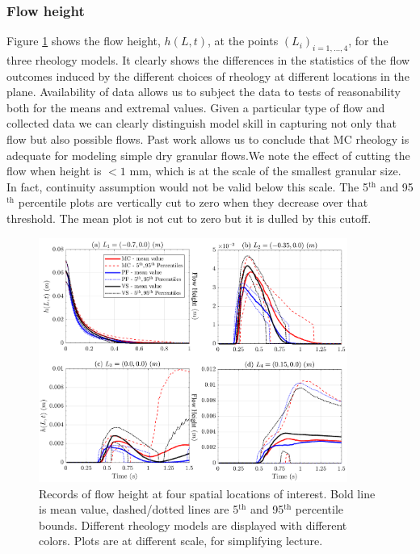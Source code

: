 \documentclass{article}
\begin{document}
\subsubsection{Flow height}
Figure \ref{fig:Ramp-H} shows the flow height, $h(L,t)$, at the points $(L_i)_{i=1,\dots,4}$, for the three rheology models. It clearly shows the differences in the statistics of the flow outcomes induced by the different choices of rheology at different locations in the plane. Availability of data allows us to subject the data to tests of reasonability both for the means and extremal values. Given a particular type of flow and collected data we can clearly distinguish model  skill in capturing not only that flow but also possible flows. Past work \cite{Webb2004} allows us to conclude that MC rheology is adequate for modeling simple dry granular flows.We note the effect of cutting the flow when height is $<1$ mm, which is at the scale of the smallest granular size. In fact, continuity assumption would not be valid below this scale. The 5$^{\mathrm{th}}$ and 95$^{\mathrm{th}}$ percentile plots are vertically cut to zero when they decrease over that threshold. The mean plot is not cut to zero but it is dulled by this cutoff.
\begin{figure}[H]
         \centering
        \includegraphics[width=0.9\textwidth]{InclinedPlane/LocalMeasurments/Height.png}
        \caption{Records of flow height at four spatial locations of interest. Bold line is mean value, dashed/dotted lines are 5$^{\mathrm{th}}$ and 95$^{\mathrm{th}}$ percentile bounds. Different rheology models are displayed with different colors. Plots are at different scale, for simplifying lecture.}
        \label{fig:Ramp-H}
\end{figure}
\end{document}

